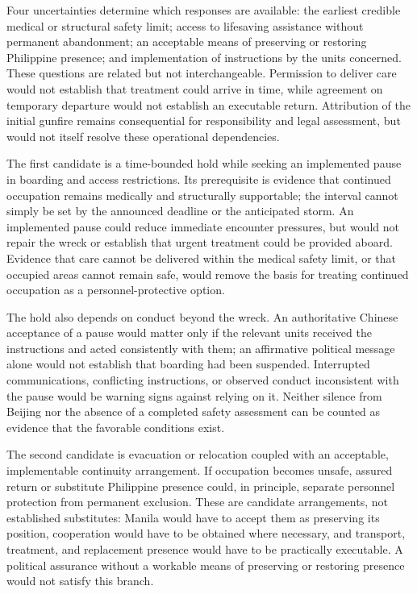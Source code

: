 \documentclass[11pt]{article}
\begin{document}
Four uncertainties determine which responses are available: the earliest credible medical or structural safety limit; access to lifesaving assistance without permanent abandonment; an acceptable means of preserving or restoring Philippine presence; and implementation of instructions by the units concerned. These questions are related but not interchangeable. Permission to deliver care would not establish that treatment could arrive in time, while agreement on temporary departure would not establish an executable return. Attribution of the initial gunfire remains consequential for responsibility and legal assessment, but would not itself resolve these operational dependencies.

The first candidate is a time-bounded hold while seeking an implemented pause in boarding and access restrictions. Its prerequisite is evidence that continued occupation remains medically and structurally supportable; the interval cannot simply be set by the announced deadline or the anticipated storm. An implemented pause could reduce immediate encounter pressures, but would not repair the wreck or establish that urgent treatment could be provided aboard. Evidence that care cannot be delivered within the medical safety limit, or that occupied areas cannot remain safe, would remove the basis for treating continued occupation as a personnel-protective option.

The hold also depends on conduct beyond the wreck. An authoritative Chinese acceptance of a pause would matter only if the relevant units received the instructions and acted consistently with them; an affirmative political message alone would not establish that boarding had been suspended. Interrupted communications, conflicting instructions, or observed conduct inconsistent with the pause would be warning signs against relying on it. Neither silence from Beijing nor the absence of a completed safety assessment can be counted as evidence that the favorable conditions exist.

The second candidate is evacuation or relocation coupled with an acceptable, implementable continuity arrangement. If occupation becomes unsafe, assured return or substitute Philippine presence could, in principle, separate personnel protection from permanent exclusion. These are candidate arrangements, not established substitutes: Manila would have to accept them as preserving its position, cooperation would have to be obtained where necessary, and transport, treatment, and replacement presence would have to be practically executable. A political assurance without a workable means of preserving or restoring presence would not satisfy this branch.
\end{document}

